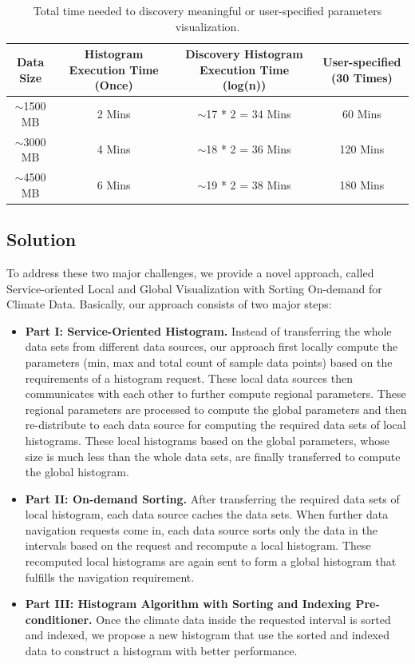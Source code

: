 \documentclass[times, 10pt,onecolumn]{article} %
\begin{document}
\begin{table}[!iht]
\centering
\begin{tabular}{|c|c|c|c|}
\hline
\textbf{Data Size} & \textbf{Histogram Execution Time (Once) } & \textbf{Discovery Histogram Execution Time (log(n))} & \textbf{User-specified (30 Times)} \\ \hline
$\sim$1500 MB & 2 Mins & $\sim$17 * 2 = 34 Mins & 60 Mins \\ \hline
$\sim$3000 MB & 4 Mins &  $\sim$18 * 2 = 36 Mins & 120 Mins \\ \hline 
$\sim$4500 MB & 6 Mins &  $\sim$19 * 2 = 38 Mins & 180 Mins \\ \hline 
\end{tabular}
\caption{Total time needed to discovery meaningful or user-specified parameters visualization.}
\label{tbl:time}
\end{table}

\subsection{Solution}
To address these two major challenges, we provide a novel approach, called Service-oriented Local and Global Visualization with Sorting On-demand for Climate Data. Basically, our approach consists of two major steps: 

\begin{itemize}
\item{\textbf{Part I: Service-Oriented Histogram.}} Instead of transferring the whole data sets from different data sources, our approach first locally compute the parameters (min, max and total count of sample data points) based on the requirements of a histogram request. These local data sources then communicates with each other to further compute regional parameters. These regional parameters are processed to compute the global parameters and then re-distribute to each data source for computing the required data sets of local histograms. These local histograms based on the global parameters, whose size is much less than the whole data sets, are finally transferred to compute the global histogram.
\item{\textbf{Part II: On-demand Sorting.}} After transferring the required data sets of local histogram, each data source caches the data sets. When further data navigation requests come in, each data source sorts only the data in the intervals based on the request and recompute a local histogram. These recomputed local histograms are again sent to form a global histogram that fulfills the navigation requirement. 
\item{\textbf{Part III: Histogram Algorithm with Sorting and Indexing Pre-conditioner.}} Once the climate data inside the requested interval is sorted and indexed, we propose a new histogram that use the sorted and indexed data to construct a histogram with better performance.
\end{itemize}
\end{document}
